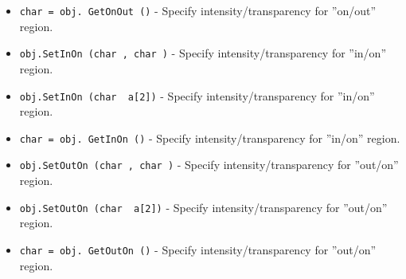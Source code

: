 \begin{itemize}
\item  \verb|char = obj. GetOnOut ()| -  Specify intensity/transparency for ''on/out'' region.

\item  \verb|obj.SetInOn (char , char )| -  Specify intensity/transparency for ''in/on'' region.

\item  \verb|obj.SetInOn (char  a[2])| -  Specify intensity/transparency for ''in/on'' region.

\item  \verb|char = obj. GetInOn ()| -  Specify intensity/transparency for ''in/on'' region.

\item  \verb|obj.SetOutOn (char , char )| -  Specify intensity/transparency for ''out/on'' region.

\item  \verb|obj.SetOutOn (char  a[2])| -  Specify intensity/transparency for ''out/on'' region.

\item  \verb|char = obj. GetOutOn ()| -  Specify intensity/transparency for ''out/on'' region.

\end{itemize}
